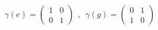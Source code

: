 \begin{equation}
\gamma (e) = \left( \begin{array}{cc} 1 & 0\\ 0 & 1
\end{array}
\right) ~~,~~ \gamma (g) = \left( \begin{array}{cc} 0 & 1\\ 1 & 0
\end{array}
\right)
\label{rep2}
\end{equation}

